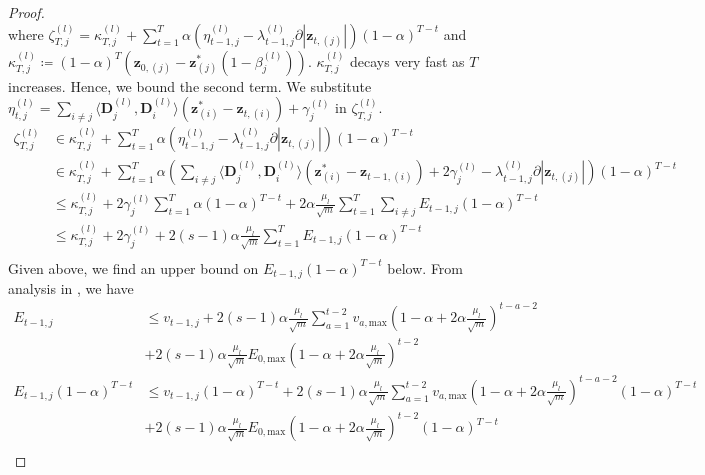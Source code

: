 \documentclass[10pt]{article} %
\newcommand{\D}{{\bm D}}
\newcommand{\z}{{\bm z}}
\begin{document}
\begin{proof}
\begin{equation}
\end{equation}
where $\zeta _{T,j}^{(l)} = \kappa_{T,j}^{(l)} + \sum_{t=1}^T \alpha  (\eta_{t-1,j}^{(l)} - \lambda_{t-1,j}^{(l)}  \partial | \z_{t, (j)} |) (1 - \alpha)^{T-t}$ and $\kappa_{T,j}^{(l)} \coloneqq (1 - \alpha)^T (\z_{0, (j)} - \z^{\ast}_{(j)} (1 - \beta_j^{(l)}))$. $\kappa_{T,j}^{(l)}$ decays very fast as $T$ increases. Hence, we bound the second term. We substitute $\eta_{t,j}^{(l)} = \sum_{i \neq j} \langle \D_j^{(l)}, \D_i^{(l)} \rangle (\z^{\ast}_{(i)} - \z_{t, (i)}) + \gamma_j^{(l)}$ in $\zeta_{T,j}^{(l)}$.
\begin{equation}
\begin{aligned}
\zeta _{T,j}^{(l)} &\in \kappa_{T,j}^{(l)} + \sum_{t=1}^T \alpha  (\eta_{t-1,j}^{(l)} - \lambda_{t-1,j}^{(l)} \partial | \z_{t, (j)} |) (1 - \alpha)^{T-t}\\
&\in \kappa_{T,j}^{(l)} + \sum_{t=1}^T \alpha  (\sum_{i \neq j} \langle \D_j^{(l)}, \D_i^{(l)} \rangle (\z^{\ast}_{(i)} - \z_{t-1, (i)}) + 2\gamma_j^{(l)} - \lambda_{t-1,j}^{(l)} \partial | \z_{t, (j)} |) (1 - \alpha)^{T-t}\\
&\leq \kappa_{T,j}^{(l)} + 2\gamma_j^{(l)} \sum_{t=1}^T \alpha (1 - \alpha)^{T-t}  + 2 \alpha \frac{\mu_l}{\sqrt{m}}\sum_{t=1}^T \sum_{i \neq j} E_{t-1,j} (1 - \alpha)^{T-t}\\
&\leq \kappa_{T,j}^{(l)} + 2\gamma_j^{(l)} + 2 (s-1) \alpha \frac{\mu_l}{\sqrt{m}}\sum_{t=1}^T  E_{t-1,j} (1 - \alpha)^{T-t}\\
\end{aligned}
\end{equation}
Given above, we find an upper bound on $E_{t-1,j} (1 - \alpha)^{T-t}$ below. From analysis in , we have
\begin{equation}
\begin{aligned}
E_{t-1, j} &\leq v_{t-1, j} + 2 (s-1) \alpha \frac{\mu_l}{\sqrt{m}} \sum_{a=1}^{t-2} v_{a, \text{max}} (1 - \alpha + 2 \alpha \frac{\mu_l}{\sqrt{m}})^{t - a - 2}\\
&+ 2 (s-1) \alpha \frac{\mu_l}{\sqrt{m}} E_{0, \text{max}} (1 - \alpha + 2 \alpha \frac{\mu_l}{\sqrt{m}})^{t-2}\\
E_{t-1, j} (1 - \alpha)^{T-t} &\leq v_{t-1, j} (1 - \alpha)^{T-t} + 2 (s-1) \alpha \frac{\mu_l}{\sqrt{m}} \sum_{a=1}^{t-2} v_{a, \text{max}} (1 - \alpha + 2 \alpha \frac{\mu_l}{\sqrt{m}})^{t - a - 2} (1 - \alpha)^{T-t}\\
&+ 2 (s-1) \alpha \frac{\mu_l}{\sqrt{m}} E_{0, \text{max}} (1 - \alpha + 2 \alpha \frac{\mu_l}{\sqrt{m}})^{t-2} (1 - \alpha)^{T-t}\\

\end{aligned}
\end{equation}
\end{proof}
\end{document}
